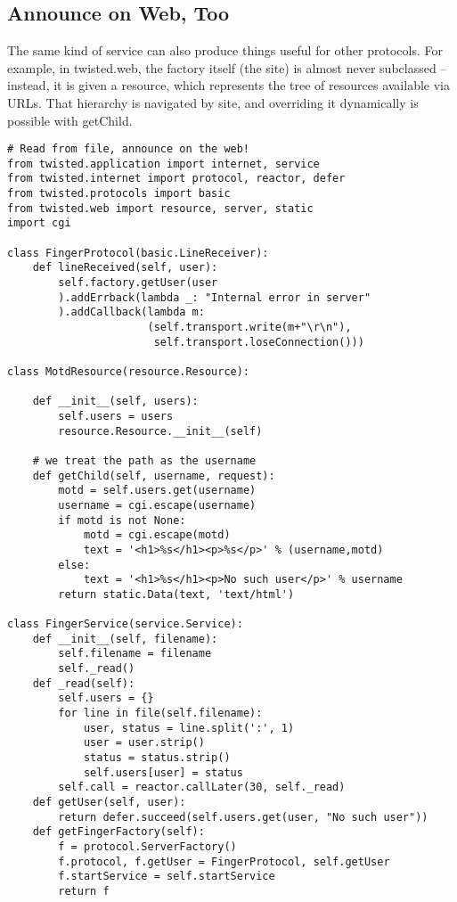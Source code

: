 \subsection{Announce on Web, Too}


The same kind of service can also produce things useful for other protocols. For example, in twisted.web, the factory itself (the site) is almost never subclassed -- instead, it is given a resource, which represents the tree of resources available via URLs. That hierarchy is navigated by site, and overriding it dynamically is possible with getChild.\begin{verbatim}
# Read from file, announce on the web!
from twisted.application import internet, service
from twisted.internet import protocol, reactor, defer
from twisted.protocols import basic
from twisted.web import resource, server, static
import cgi

class FingerProtocol(basic.LineReceiver):
    def lineReceived(self, user):
        self.factory.getUser(user
        ).addErrback(lambda _: "Internal error in server"
        ).addCallback(lambda m:
                      (self.transport.write(m+"\r\n"),
                       self.transport.loseConnection()))

class MotdResource(resource.Resource):

    def __init__(self, users):
        self.users = users
        resource.Resource.__init__(self)

    # we treat the path as the username
    def getChild(self, username, request):
        motd = self.users.get(username)
        username = cgi.escape(username)
        if motd is not None:
            motd = cgi.escape(motd)
            text = '<h1>%s</h1><p>%s</p>' % (username,motd)
        else:
            text = '<h1>%s</h1><p>No such user</p>' % username
        return static.Data(text, 'text/html')

class FingerService(service.Service):
    def __init__(self, filename):
        self.filename = filename
        self._read()
    def _read(self):
        self.users = {}
        for line in file(self.filename):
            user, status = line.split(':', 1)
            user = user.strip()
            status = status.strip()
            self.users[user] = status
        self.call = reactor.callLater(30, self._read)
    def getUser(self, user):
        return defer.succeed(self.users.get(user, "No such user"))
    def getFingerFactory(self):
        f = protocol.ServerFactory()
        f.protocol, f.getUser = FingerProtocol, self.getUser
        f.startService = self.startService
        return f


\end{verbatim}
